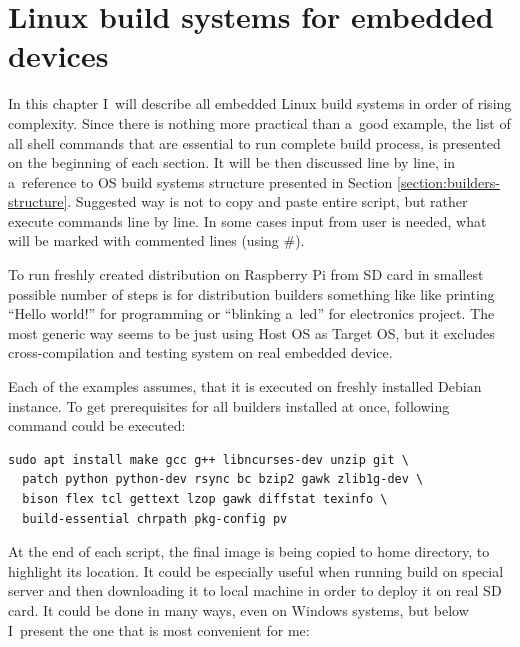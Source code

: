 \documentclass[printmode]{mgr}
\begin{document}
\chapter{Linux build systems for embedded devices}
\label{chapter:build-systems}






In this chapter I~will describe all embedded Linux build systems in order of rising complexity.
Since there is nothing more practical than a~good example, the list of all shell commands that are essential to run complete build process, is presented on the beginning of each section.
It will be then discussed line by line, in a~reference to OS build systems structure presented in Section \ref{section:builders-structure}.
Suggested way is not to copy and paste entire script, but rather execute commands line by line.
In some cases input from user is needed, what will be marked with commented lines (using \#).

To run freshly created distribution on Raspberry Pi from SD card in smallest possible number of steps is for distribution builders something like like printing ``Hello world!'' for programming or ``blinking a~led'' for electronics project.
The most generic way seems to be just using Host OS as Target OS, but it excludes cross-compilation and testing system on real embedded device.

Each of the examples assumes, that it is executed on freshly installed Debian instance.
To get prerequisites for all builders installed at once, following command could be executed:


\begin{lstlisting}
sudo apt install make gcc g++ libncurses-dev unzip git \
  patch python python-dev rsync bc bzip2 gawk zlib1g-dev \ 
  bison flex tcl gettext lzop gawk diffstat texinfo \
  build-essential chrpath pkg-config pv
\end{lstlisting}

At the end of each script, the final image is being copied to home directory, to highlight its location.
It could be especially useful when running build on special server and then downloading it to local machine in order to deploy it on real SD card.
It could be done in many ways, even on Windows systems, but below I~present the one that is most convenient for me:
\end{document}
